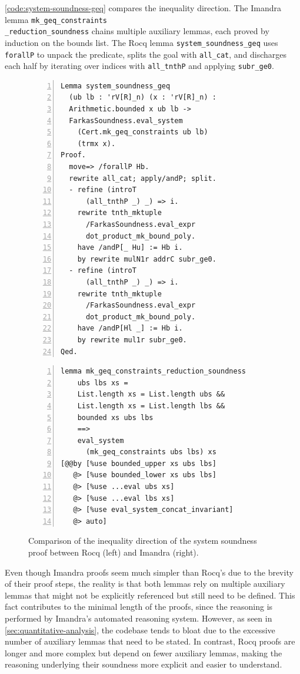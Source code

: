 \autoref{code:system-soundness-geq} compares the inequality direction.  The Imandra lemma \texttt{mk\_geq\_constraints\\\_reduction\_soundness} chains multiple auxiliary lemmas, each proved by induction on the bounds list.  The Rocq lemma \texttt{system\_soundness\_geq} uses \texttt{forallP} to unpack the predicate, splits the goal with \texttt{all\_cat}, and discharges each half by iterating over indices with \texttt{all\_tnthP} and applying \texttt{subr\_ge0}. 

\begin{figure}[h]
\begin{minipage}{0.48\textwidth}
\begin{lstlisting}[language=Coq, numbers=left, breaklines=true, basicstyle=\tiny\ttfamily]
Lemma system_soundness_geq
  (ub lb : 'rV[R]_n) (x : 'rV[R]_n) :
  Arithmetic.bounded x ub lb ->
  FarkasSoundness.eval_system
    (Cert.mk_geq_constraints ub lb)
    (trmx x).
Proof.
  move=> /forallP Hb.
  rewrite all_cat; apply/andP; split.
  - refine (introT
      (all_tnthP _) _) => i.
    rewrite tnth_mktuple
      /FarkasSoundness.eval_expr
      dot_product_mk_bound_poly.
    have /andP[_ Hu] := Hb i.
    by rewrite mulN1r addrC subr_ge0.
  - refine (introT
      (all_tnthP _) _) => i.
    rewrite tnth_mktuple
      /FarkasSoundness.eval_expr
      dot_product_mk_bound_poly.
    have /andP[Hl _] := Hb i.
    by rewrite mul1r subr_ge0.
Qed.
\end{lstlisting}
\end{minipage}
\hfill
\begin{minipage}{0.48\textwidth}
\begin{lstlisting}[language=Imandra, numbers=left, breaklines=true, basicstyle=\tiny\ttfamily]
lemma mk_geq_constraints_reduction_soundness
    ubs lbs xs =
    List.length xs = List.length ubs &&
    List.length xs = List.length lbs &&
    bounded xs ubs lbs
    ==>
    eval_system
      (mk_geq_constraints ubs lbs) xs
[@@by [%use bounded_upper xs ubs lbs]
   @> [%use bounded_lower xs ubs lbs]
   @> [%use ...eval ubs xs]
   @> [%use ...eval lbs xs]
   @> [%use eval_system_concat_invariant]
   @> auto]
\end{lstlisting}
\end{minipage}
\caption{Comparison of the inequality direction of the system soundness proof between Rocq (left) and Imandra (right).}
\label{code:system-soundness-geq}
\end{figure}

Even though Imandra proofs seem much simpler than Rocq's due to the brevity of their proof steps, the reality is that both lemmas rely on multiple auxiliary lemmas that might not be explicitly referenced but still need to be defined. This fact contributes to the minimal length of the proofs, since the reasoning is performed by Imandra's automated reasoning system. However, as seen in \autoref{sec:quantitative-analysis}, the codebase tends to bloat due to the excessive number of auxiliary lemmas that need to be stated. In contrast, Rocq proofs are longer and more complex but depend on fewer auxiliary lemmas, making the reasoning underlying their soundness more explicit and easier to understand.



